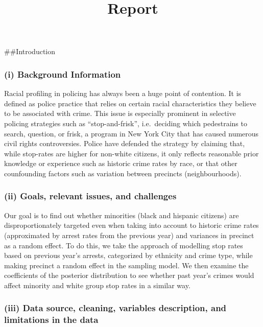 \documentclass[]{article}
\title{Report}
\author{}
\date{}
\begin{document}
\maketitle

\#\#Introduction

\hypertarget{i-background-information}{%
\subsubsection{(i) Background
Information}\label{i-background-information}}

Racial profiling in policing has always been a huge point of contention.
It is defined as police practice that relies on certain racial
characteristics they believe to be associated with crime. This issue is
especially prominent in selective policing strategies such as
``stop-and-frisk'', i.e.~deciding which pedestrains to search, question,
or frisk, a program in New York City that has caused numerous civil
rights controversies. Police have defended the strategy by claiming
that, while stop-rates are higher for non-white citizens, it only
reflects reasonable prior knowledge or experience such as historic crime
rates by race, or that other counfounding factors such as variation
between precincts (neighbourhoods).

\hypertarget{ii-goals-relevant-issues-and-challenges}{%
\subsubsection{(ii) Goals, relevant issues, and
challenges}\label{ii-goals-relevant-issues-and-challenges}}

Our goal is to find out whether minorities (black and hispanic citizens)
are disproportionately targeted even when taking into account to
historic crime rates (approximated by arrest rates from the previous
year) and variances in precinct as a random effect. To do this, we take
the approach of modelling stop rates based on previous year's arrests,
categorized by ethnicity and crime type, while making precinct a random
effect in the sampling model. We then examine the coefficients of the
posterior distribution to see whether past year's crimes would affect
minority and white group stop rates in a similar way.

\hypertarget{iii-data-source-cleaning-variables-description-and-limitations-in-the-data}{%
\subsubsection{(iii) Data source, cleaning, variables description, and
limitations in the
data}\label{iii-data-source-cleaning-variables-description-and-limitations-in-the-data}}
\end{document}
